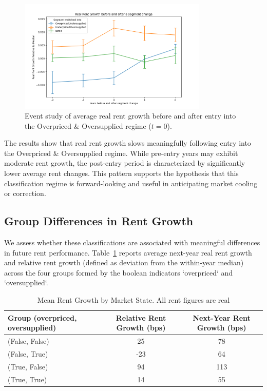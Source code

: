\documentclass[APA,Times1COL]{WileyNJDv5} %
\begin{document}
\begin{figure}[h]
	\centering
	\includegraphics[width=0.8\textwidth]{event_study.png}
	\caption*{Event study of average real rent growth before and after entry into the Overpriced \& Oversupplied regime ($t=0$).}
	\label{fig:event_study}
\end{figure}

The results show that real rent growth slows meaningfully following entry into the Overpriced \& Oversupplied regime. While pre-entry years may exhibit moderate rent growth, the post-entry period is characterized by significantly lower average rent changes. This pattern supports the hypothesis that this classification regime is forward-looking and useful in anticipating market cooling or correction.

\subsection{Group Differences in Rent Growth}

We assess whether these classifications are associated with meaningful differences in future rent performance. Table~\ref{tab:simplifiedmeans} reports average next-year real rent growth and relative rent growth (defined as deviation from the within-year median) across the four groups formed by the boolean indicators `overpriced` and `oversupplied`.

\begin{table}[h!]
	\centering
	\caption*{Mean Rent Growth by Market State. All rent figures are real}
	\label{tab:simplifiedmeans}
	\begin{tabular}{lcc}
		\toprule
		\textbf{Group (overpriced, oversupplied)} & \textbf{Relative Rent Growth (bps)} & \textbf{Next-Year Rent Growth (bps)} \\
		\midrule
		(False, False) & 25 & 78 \\
		(False, True)  & -23 & 64 \\
		(True, False)  & 94 & 113 \\
		(True, True)   & 14 & 55 \\
		\bottomrule
	\end{tabular}
\end{table}
\end{document}
